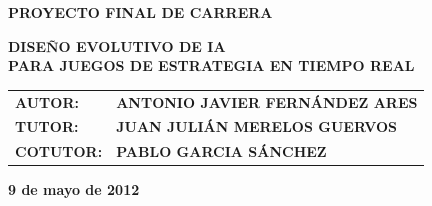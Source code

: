 \begin{titlepage}
\begin{center}
{\large\textbf {PROYECTO FINAL DE CARRERA}}\\ \vspace{1.5cm}

{\Large \bf DISEÑO EVOLUTIVO DE IA}\\ \vspace{0.2cm}
{\Large \bf PARA JUEGOS DE ESTRATEGIA EN TIEMPO REAL}\\ \vspace{3.5cm}
\end{center}


\begin{table}[h]
    \begin{flushright}
        \begin{tabular}{l @{\quad} l}
            \textbf{AUTOR:} & \textbf{ANTONIO JAVIER FERNÁNDEZ ARES}\\
            \textbf{TUTOR:} & \textbf{JUAN JULIÁN MERELOS GUERVOS}\\
            \textbf{COTUTOR:} & \textbf{PABLO GARCIA SÁNCHEZ}
        \end{tabular}
        \end{flushright}
\end{table}
\begin{flushright}
{\large \textbf{9 de mayo de 2012}}
\end{flushright}

\end{titlepage}

